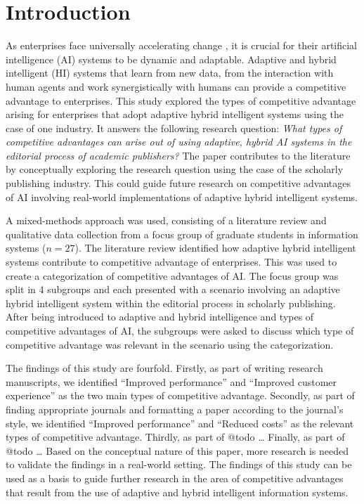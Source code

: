 \section{Introduction}
\label{sec:introduction}

As enterprises face universally accelerating change \citep{eliazarUniversalityAcceleratingChange2018}, it
is crucial for their artificial intelligence (AI) systems to be dynamic and adaptable. Adaptive and hybrid
intelligent (HI) systems that learn from new data, from the interaction with human agents and work
synergistically with humans can provide a competitive advantage to enterprises. This study explored the types
of competitive advantage arising for enterprises that adopt adaptive hybrid intelligent systems using the case
of one industry. It answers the following research question: \textit{What types of competitive advantages can
arise out of using adaptive, hybrid AI systems in the editorial process of academic publishers?} The paper
contributes to the literature by conceptually exploring the research question using the case of the scholarly
publishing industry. This could guide future research on competitive advantages of AI involving real-world
implementations of adaptive hybrid intelligent systems.

A mixed-methods approach was used, consisting of a literature review and qualitative data collection from
a focus group of graduate students in information systems ($n = 27$). The literature review identified how 
adaptive hybrid intelligent systems contribute to competitive advantage of enterprises. This was used to 
create a categorization of competitive advantages of AI. The focus group was split in 4 subgroups and each
presented with a scenario involving an adaptive hybrid intelligent system within the editorial process in
scholarly publishing. After being introduced to adaptive and hybrid intelligence and types of competitive 
advantages of AI, the subgroups were asked to discuss which type of competitive advantage was relevant in
the scenario using the categorization.

The findings of this study are fourfold. Firstly, as part of writing research manuscripts, we identified
``Improved performance'' and ``Improved customer experience'' as the two main types of competitive advantage.
Secondly, as part of finding appropriate journals and formatting a paper according to the journal's style, 
we identified ``Improved performance'' and ``Reduced costs'' as the relevant types of competitive advantage.
Thirdly, as part of {\color{purple} @todo \dots}
Finally, as part of {\color{purple} @todo \dots}
Based on the conceptual nature of this paper, more research is needed to validate the findings in a real-world
setting. The findings of this study can be used as a basis to guide further research in the area of competitive 
advantages that result from the use of adaptive and hybrid intelligent information systems.

